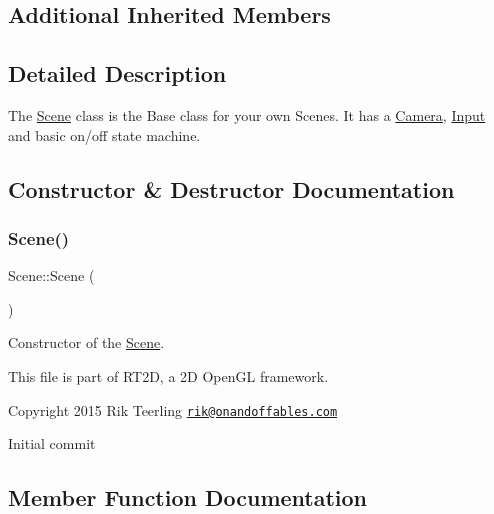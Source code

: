 \subsection*{Additional Inherited Members}


\subsection{Detailed Description}
The \hyperlink{class_scene}{Scene} class is the Base class for your own Scenes. It has a \hyperlink{class_camera}{Camera}, \hyperlink{class_input}{Input} and basic on/off state machine. 

\subsection{Constructor \& Destructor Documentation}
\mbox{\label{class_scene_ad10176d75a9cc0da56626f682d083507}} 
\subsubsection{\texorpdfstring{Scene()}{Scene()}}
{\footnotesize\ttfamily Scene\+::\+Scene (\begin{DoxyParamCaption}{ }\end{DoxyParamCaption})}



Constructor of the \hyperlink{class_scene}{Scene}. 

This file is part of R\+T2D, a 2D Open\+GL framework.


\begin{DoxyItemize}
\item Copyright 2015 Rik Teerling \href{mailto:rik@onandoffables.com}{\tt rik@onandoffables.\+com}
\begin{DoxyItemize}
\item Initial commit 
\end{DoxyItemize}
\end{DoxyItemize}

\subsection{Member Function Documentation}
\mbox{\label{class_scene_a1845161fcd088622a1288a6c41bcd574}} 
